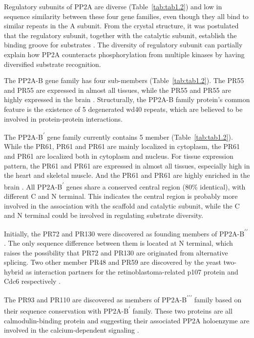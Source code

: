 Regulatory subunits of PP2A are diverse (Table~\ref{tab:tab1.2}) and low in sequence similarity between these four gene families, even though they all bind to similar repeats in the A subunit. From the crystal structure, it was postulated that the regulatory subunit, together with the catalytic subunit, establish the binding groove for substrates \cite{xing_structure_2006}. The diversity of regulatory subunit can partially explain how PP2A counteracts phosphorylation from multiple kinases by having diversified substrate recognition. 

The PP2A-B gene family has four sub-members (Table~\ref{tab:tab1.2}). The PR55\textalpha{} and PR55\textdelta{} are expressed in almost all tissues, while the PR55\textbeta{} and PR55\textgamma{} are highly expressed in the brain \cite{janssens_protein_2001}. Structurally, the PP2A-B family protein's common feature is the existence of 5 degenerated \gls{wd40} repeats, which are believed to be involved in protein-protein interactions.

The PP2A-B\textsuperscript{$\prime$} gene family currently contains 5 member (Table~\ref{tab:tab1.2}). While the PR61\textalpha{}, PR61\textbeta{} and PR61\textepsilon{}  are mainly localized in cytoplasm, the PR61\textgamma{} and PR61\textdelta{} are localized both in cytoplasm and nucleus. For tissue expression pattern, the PR61\textalpha{} and PR61\textgamma{} are expressed in almost all tissues, especially high in the heart and skeletal muscle. And  the PR61\textbeta{} and PR61\textdelta{} are highly enriched in the brain \cite{csortos_high_1996,tehrani_identification_1996,tanabe_molecular_1996}. All PP2A-B\textsuperscript{$\prime$} genes share a conserved central region (80\% identical), with different C and N terminal. This indicates the central region is probably more involved in the association with the scaffold and catalytic subunit, while the C and N terminal could be involved in regulating substrate diversity. 

Initially, the PR72 and PR130 were discovered as founding members of PP2A-B\textsuperscript{$\prime\prime$} \cite{hendrix_structure_1993}. The only sequence difference between them is located at N terminal, which raises the possibility that PR72 and PR130 are originated from alternative splicing. Two other member PR48 and PR59 are discovered by the yeast two-hybrid as interaction partners for the retinoblastoma-related p107 protein and Cdc6 respectively \cite{voorhoeve_functional_1999,yan_pr48_2000}.

The PR93 and PR110 are discovered as members of PP2A-B\textsuperscript{$\prime\prime\prime$} family based on their sequence conservation with PP2A-B\textsuperscript{$\prime$} family. These two proteins are all calmodulin-binding protein and suggesting their associated PP2A holoenzyme are involved in the calcium-dependent signaling \cite{moreno_wd40_2000}.

